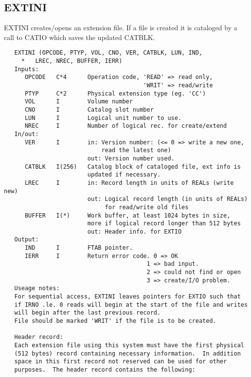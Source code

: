 \subsection{EXTINI}
EXTINI creates/opens an extension file.  If a file is created it
is cataloged by a call to CATIO which saves the updated CATBLK.
\begin{verbatim}
   EXTINI (OPCODE, PTYP, VOL, CNO, VER, CATBLK, LUN, IND,
     *   LREC, NREC, BUFFER, IERR)
   Inputs:
      OPCODE   C*4      Operation code, 'READ' => read only,
                                        'WRIT' => read/write
      PTYP     C*2      Physical extension type (eg. 'CC')
      VOL      I        Volume number
      CNO      I        Catalog slot number
      LUN      I        Logical unit number to use.
      NREC     I        Number of logical rec. for create/extend
   In/out:
      VER      I        in: Version number: (<= 0 => write a new one,
                            read the latest one)
                        out: Version number used.
      CATBLK   I(256)   Catalog block of cataloged file, ext info is
                        updated if necessary.
      LREC     I        in: Record length in units of REALs (write new)
                        out: Logical record length (in units of REALs)
                             for read/write old files
      BUFFER   I(*)     Work buffer, at least 1024 bytes in size,
                        more if logical record longer than 512 bytes
                        out: Header info. for EXTIO
   Output:
      IND      I        FTAB pointer.
      IERR     I        Return error code. 0 => OK
                                         1 => bad input.
                                         2 => could not find or open
                                         3 => create/I/O problem.
   Useage notes:
   For sequential access, EXTINI leaves pointers for EXTIO such that
   if IRNO .le. 0 reads will begin at the start of the file and writes
   will begin after the last previous record.
   File should be marked 'WRIT' if the file is to be created.

   Header record:
   Each extension file using this system must have the first physical
   (512 bytes) record containing necessary information.  In addition
   space in this first record not reserved can be used for other
   purposes.  The header record contains the following:


\end{verbatim}
